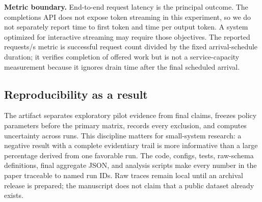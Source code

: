 \textbf{Metric boundary.} End-to-end request latency is the principal outcome.
The completions API does not expose token streaming in this experiment, so we
do not separately report time to first token and time per output token. A
system optimized for interactive streaming may require those objectives. The
reported requests/s metric is successful request count divided by the fixed
arrival-schedule duration; it verifies completion of offered work but is not a
service-capacity measurement because it ignores drain time after the final
scheduled arrival.

\subsection{Reproducibility as a result}

The artifact separates exploratory pilot evidence from final claims, freezes
policy parameters before the primary matrix, records every exclusion, and
computes uncertainty across runs. This discipline matters for small-system
research: a negative result with a complete evidentiary trail is more
informative than a large percentage derived from one favorable run. The code,
configs, tests, raw-schema definitions, final aggregate JSON, and analysis
scripts make every number in the paper traceable to named run IDs. Raw traces
remain local until an archival release is prepared; the manuscript does not
claim that a public dataset already exists.

